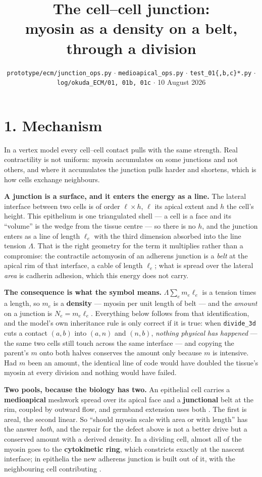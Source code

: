 \documentclass[10pt,a4paper]{article}
\title{\vspace{-1.4cm}\textbf{The cell--cell junction:\\
\normalsize myosin as a density on a belt, through a division}}
\author{}
\date{\vspace{-0.9cm}\small \texttt{prototype/ecm/junction\_ops.py} $\cdot$
\texttt{medioapical\_ops.py} $\cdot$
\texttt{test\_01\{,b,c\}*.py} $\cdot$
\texttt{log/okuda\_ECM/01, 01b, 01c} $\cdot$ 10 August 2026}
\newcommand{\op}[1]{\texttt{#1}}
\begin{document}
\maketitle\vspace{-1.0cm}

\section*{1.\; Mechanism}

In a vertex model every cell--cell contact pulls with the same strength. Real contractility is not
uniform: myosin accumulates on some junctions and not others, and where it accumulates the junction
pulls harder and shortens, which is how cells exchange neighbours.

\textbf{A junction is a surface, and it enters the energy as a line.} The lateral interface between
two cells is of order $\ell\times h$, $\ell$ its apical extent and $h$ the cell's height. This
epithelium is one triangulated shell --- a cell is a face and its ``volume'' is the wedge from the
tissue centre --- so there is no $h$, and the junction enters as a line of length $\ell_e$ with the
third dimension absorbed into the line tension $\Lambda$. That is the right geometry for the term it
multiplies rather than a compromise: the contractile actomyosin of an adherens junction is a
\emph{belt} at the apical rim of that interface, a cable of length $\ell_e$; what is spread over the
lateral \emph{area} is cadherin adhesion, which this energy does not carry.

\textbf{The consequence is what the symbol means.} $\Lambda\sum_e m_e\ell_e$ is a tension times a
length, so $m_e$ is a \textbf{density} --- myosin per unit length of belt --- and the \emph{amount} on
a junction is $N_e=m_e\ell_e$. Everything below follows from that identification, and the model's own
inheritance rule is only correct if it is true: when \op{divide\_3d} cuts a contact $(a,b)$ into
$(a,n)$ and $(n,b)$, \emph{nothing physical has happened} --- the same two cells still touch across the
same interface --- and copying the parent's $m$ onto both halves conserves the amount only because $m$
is intensive. Had $m$ been an amount, the identical line of code would have doubled the tissue's
myosin at every division and nothing would have failed.

\textbf{Two pools, because the biology has two.} An epithelial cell carries a \textbf{medioapical}
meshwork spread over its apical face and a \textbf{junctional} belt at the rim, coupled by outward
flow, and germband extension uses both \cite{munjal2015}. The first is areal, the second linear. So
``should myosin scale with area or with length'' has the answer \emph{both}, and the repair for the
defect above is not a better drive but a conserved amount with a derived density. In a dividing cell,
almost all of the myosin goes to the \textbf{cytokinetic ring}, which constricts exactly at the nascent
interface; in epithelia the new adherens junction is built out of it, with the neighbouring cell
contributing \cite{herszterg2013,founounou2013}.
\end{document}
